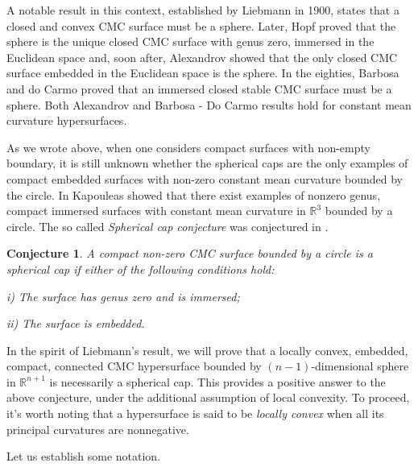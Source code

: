 \documentclass[11pt]{amsart}
\theoremstyle{plain}
\newtheorem{conjecture}[theorem]{Conjecture}
\numberwithin{equation}{section}
\numberwithin{theorem}{section}
\begin{document}
A notable result in this context, established by Liebmann  \cite{Lie00} in 1900, states that a closed and convex CMC surface must be a sphere. 
Later, Hopf \cite{Hopf3} proved that the sphere is the unique closed CMC surface with genus zero, immersed in the Euclidean space  and, soon after, Alexandrov  \cite{Ale56,Ale62, Hopf3} showed that the only closed CMC surface embedded  in the Euclidean space is the sphere. In the eighties, Barbosa and do Carmo  \cite{BC84} proved that an immersed  closed stable CMC surface must be a sphere.
Both Alexandrov and Barbosa - Do Carmo results hold for constant mean curvature hypersurfaces.

As we wrote above, when one considers  compact surfaces with non-empty boundary, it is still unknown whether the spherical caps are the only examples of compact embedded surfaces with non-zero constant mean curvature bounded by the circle. In  \cite{Kap91} Kapouleas showed that there exist examples of nonzero genus, compact immersed surfaces with constant mean curvature in $\mathbb{R}^3$ bounded by a circle. The so called \textit{Spherical cap conjecture}  was conjectured in \cite{BEMR91}.

\begin{conjecture}
	\label{conjecture}
	A compact non-zero CMC surface bounded by a circle is a spherical cap if either of the following conditions hold:
	
	i) The surface has genus zero and is immersed; 
	
	ii) The surface is embedded.
\end{conjecture}


In the spirit of Liebmann's result, we will prove  that   a locally convex, embedded, compact, connected CMC hypersurface bounded by $(n-1)$-dimensional sphere in $\mathbb{R}^{n+1}$ is necessarily a spherical cap. This provides a positive answer to the above conjecture, under the additional assumption of local convexity. To proceed, it’s worth noting that a hypersurface is said to be  {\em locally convex}  when all its principal curvatures are nonnegative.


Let us establish some notation.
\end{document}
